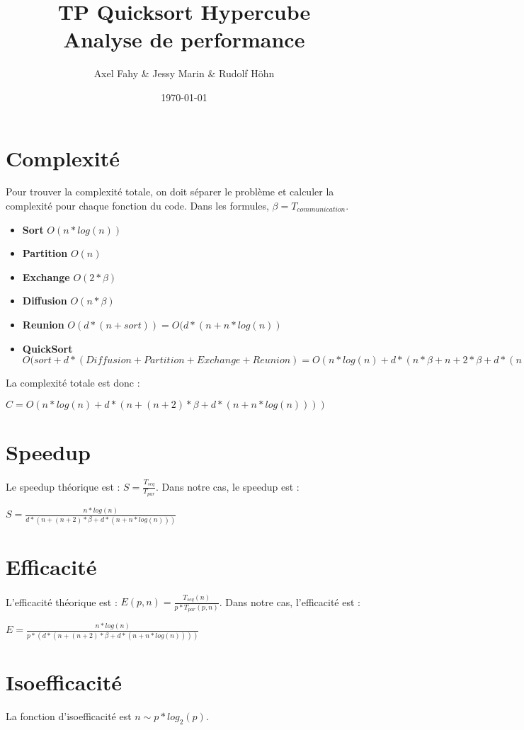 \documentclass[a4paper]{article}
\title{TP Quicksort Hypercube\\Analyse de performance}
\author{Axel Fahy \& Jessy Marin \& Rudolf Höhn}
\date{\today}
\begin{document}
\maketitle

\section{Complexité}
Pour trouver la complexité totale, on doit séparer le problème et calculer la complexité pour chaque fonction du code. Dans les formules, $\beta = T_{communication}$.
\begin{itemize}
\item \textbf{Sort} $O(n*log(n))$
\item \textbf{Partition} $O(n)$
\item \textbf{Exchange} $O(2*\beta)$
\item \textbf{Diffusion} $O(n*\beta)$
\item \textbf{Reunion} $O(d*(n+sort)) = O(d*(n+n*log(n))$
\item \textbf{QuickSort} $O(sort + d*(Diffusion + Partition + Exchange + Reunion) = O(n*log(n) + d*(n*\beta + n + 2*\beta + d*(n+n*log(n))))$
\end{itemize}
La complexité totale est donc :
\begin{center}
$C = O(n*log(n) + d*(n + (n+2)*\beta + d*(n+n*log(n))))$
\end{center}
\section{Speedup}
Le speedup théorique est : $S = \frac{T_{seq}}{T_{par}}$. Dans notre cas, le speedup est : 
\begin{center}
$S=\frac{n*log(n)}{d*(n + (n+2)*\beta + d*(n+n*log(n)))}$
\end{center}
\section{Efficacité}
L'efficacité théorique est : $E(p, n) = \frac{T_{seq}(n)}{p*T_{par}(p,n)}$. Dans notre cas, l'efficacité est :
\begin{center}
$ E=\frac{n*log(n)}{p*(d*(n + (n+2)*\beta + d*(n+n*log(n))))} $
\end{center}
\section{Isoefficacité}
La fonction d'isoefficacité est $n \sim p*log_2(p)$.
\end{document}
